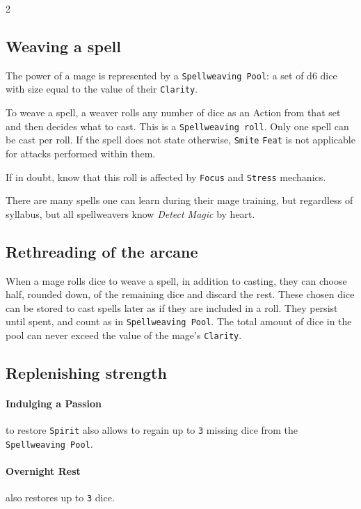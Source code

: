 \documentclass{osr-template/zine}
\begin{document}
\begin{multicols*}{2}

\subsection*{Weaving a spell}

The power of a mage is represented by a \texttt{Spellweaving Pool}: a set of d6 dice with size equal to the value of their \texttt{Clarity}.

To weave a spell, a weaver rolls any number of dice as an Action from that set and then decides what to cast. This is a \texttt{Spellweaving roll}.
Only one spell can be cast per roll. If the spell does not state otherwise, \texttt{Smite} \texttt{Feat} is not applicable for attacks performed within them.

If in doubt, know that this roll is affected by \texttt{Focus} and \texttt{Stress} mechanics.

There are many spells one can learn during their mage training, but regardless of syllabus, but all spellweavers know \textit{Detect Magic} by heart.

\subsection*{Rethreading of the arcane}

When a mage rolls dice to weave a spell, in addition to casting, they can choose half, rounded down, of the remaining dice and discard the rest.
These chosen dice can be stored to cast spells later as if they are included in a roll.
They persist until spent, and count as in \texttt{Spellweaving Pool}. The total amount of dice in the pool can never exceed the value of the mage's \texttt{Clarity}.

\subsection*{Replenishing strength}

\paragraph{Indulging a Passion} to restore \texttt{Spirit} also allows to regain up to \texttt{3} missing dice from the \texttt{Spellweaving Pool}.

\paragraph{Overnight Rest} also restores up to \texttt{3} dice.


\end{multicols*}
\end{document}
